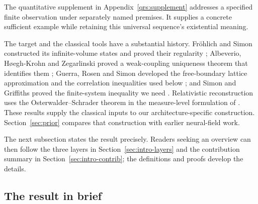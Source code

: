 \documentclass[11pt]{article}
\theoremstyle{plain}
\theoremstyle{definition}
\theoremstyle{remark}
\begin{document}
The quantitative supplement in Appendix~\ref{qrs:supplement} addresses a
specified finite observation under separately named premises. It supplies a
concrete sufficient example while retaining this universal sequence's
existential meaning.

The target and the classical tools have a substantial history. Fr\"ohlich
and Simon constructed its infinite-volume states and proved their regularity
\cite{FS1977}; Albeverio, H{\o}egh-Krohn and Zegarlinski proved a weak-coupling
uniqueness theorem that identifies them \cite{AHKZ1989}; Guerra, Rosen and
Simon developed the free-boundary lattice approximation and the correlation
inequalities used below \cite{GRS1976}; and Simon and Griffiths proved the
finite-system inequality we need \cite{SG1973}. Relativistic reconstruction
uses the Osterwalder--Schrader theorem \cite{OS1973,OS1975} in the measure-level
formulation of \cite[Thm.~1.0]{FS1977}. These results supply the classical
inputs to our architecture-specific construction. Section~\ref{sec:prior}
compares that construction with earlier neural-field work.

The next subsection states the result precisely. Readers seeking an overview
can then follow the three layers in Section~\ref{sec:intro-layers} and the
contribution summary in Section~\ref{sec:intro-contrib}; the definitions and
proofs develop the details.

\subsection{The result in brief}\label{sec:intro-result}
\end{document}
